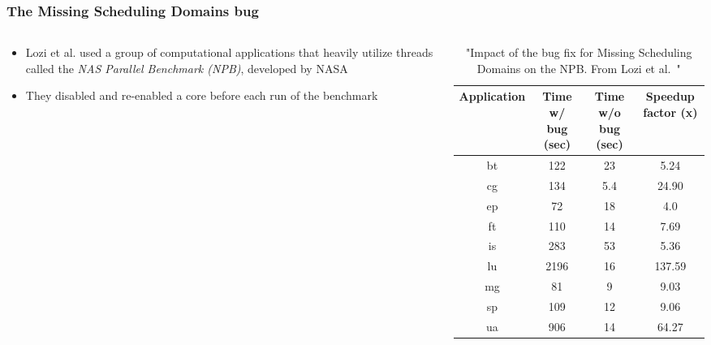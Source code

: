 \documentclass{beamer}
\newcommand{\linespace}{\vskip 0.25cm}
\begin{document}
\begin{frame}
\frametitle{The Missing Scheduling Domains bug}

\begin{columns}
\begin{column}{0.5\textwidth}

\begin{itemize}

	\item Lozi et al. used a group of computational applications that heavily utilize threads called the \emph{NAS Parallel Benchmark (NPB)}, developed by NASA
	
	\linespace
	
	\item They disabled and re-enabled a core before each run of the benchmark
\end{itemize}

\end{column}
\begin{column}{0.5\textwidth}

\begin{table}
	\centering
	\begin{tabular}{| c | c | c | c |}
		\hline			
	  	Application & Time w/ bug (sec) & Time w/o bug (sec) & Speedup factor (x) \\ \hline
	  	bt & 122 & 23 & 5.24 \\ \hline
	  	cg & 134 & 5.4 & 24.90 \\ \hline
	  	ep & 72 & 18 & 4.0 \\ \hline
	  	ft & 110 & 14 & 7.69 \\ \hline
	  	is & 283 & 53 & 5.36 \\ \hline
	  	lu & 2196 & 16 & 137.59 \\ \hline
	  	mg & 81 & 9 & 9.03 \\ \hline
	  	sp & 109 & 12 & 9.06 \\ \hline
	  	ua & 906 & 14 & 64.27 \\ \hline
		\hline
	\end{tabular}
	\caption{"Impact of the bug fix for Missing Scheduling Domains on the NPB. From Lozi et al.~\cite{Lozi:2016}"}
\end{table}

\end{column}
\end{columns}
\end{frame}
\end{document}
